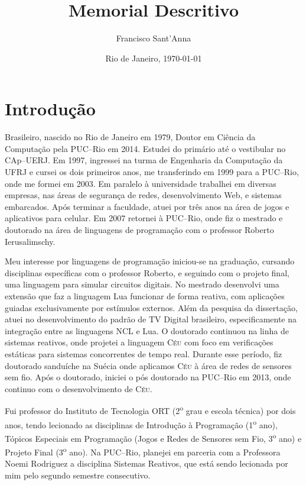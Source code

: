 \documentclass[12pt,a4paper]{article}
\title{Memorial Descritivo}
\author{Francisco Sant'Anna}
\date{Rio de Janeiro, \today}
\newcommand{\CEU}{\textsc{C\'{e}u}\xspace}
\begin{document}
\maketitle

\section*{Introdução}

Brasileiro, nascido no Rio de Janeiro em 1979, Doutor em Ciência da Computação 
pela PUC--Rio em 2014.
%
%
Estudei do primário até o vestibular no CAp--UERJ.
%
Em 1997, ingressei na turma de Engenharia da Computação da UFRJ e cursei os 
dois primeiros anos, me transferindo em 1999 para a PUC--Rio, onde me formei em 
2003.
%
Em paralelo à universidade trabalhei em diversas empresas, nas áreas de 
segurança de redes, desenvolvimento Web, e sistemas embarcados.
%
Após terminar a faculdade, atuei por três anos na área de jogos e aplicativos 
para celular.
%
Em 2007 retornei à PUC--Rio, onde fiz o mestrado e doutorado na área de 
linguagens de programação com o professor Roberto Ierusalimschy.

Meu interesse por linguagens de programação iniciou-se na graduação, cursando 
disciplinas específicas com o professor Roberto, e seguindo com o projeto 
final, uma linguagem para simular circuitos digitais.
%
No mestrado desenvolvi uma extensão que faz a linguagem Lua funcionar de forma 
reativa, com aplicações guiadas exclusivamente por estímulos externos.
%
Além da pesquisa da dissertação, atuei no desenvolvimento do padrão de TV 
Digital brasileiro, especificamente na integração entre as linguagens NCL e 
Lua.
%
O doutorado continuou na linha de sistemas reativos, onde projetei a linguagem 
\CEU com foco em verificações estáticas para sistemas concorrentes de tempo 
real.
Durante esse período, fiz doutorado sanduíche na Suécia onde aplicamos \CEU à 
área de redes de sensores sem fio.
%
Após o doutorado, iniciei o pós doutorado na PUC--Rio em 2013, onde continuo 
com o desenvolvimento de \CEU.

Fui professor do Instituto de Tecnologia ORT (2\textsuperscript{o} grau e 
escola técnica) por dois anos, tendo lecionado as disciplinas de Introdução à 
Programação (1\textsuperscript{o} ano), Tópicos Especiais em Programação (Jogos 
e Redes de Sensores sem Fio, 3\textsuperscript{o} ano) e Projeto Final 
(3\textsuperscript{o} ano).
%
Na PUC--Rio, planejei em parceria com a Professora Noemi Rodriguez a disciplina 
Sistemas Reativos, que está sendo lecionada por mim pelo segundo semestre 
consecutivo.
\end{document}
